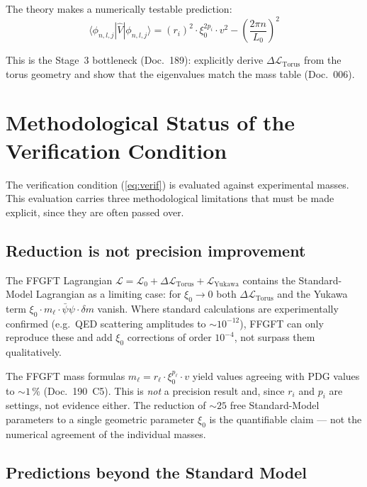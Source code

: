 The theory makes a numerically testable prediction:
\begin{equation}
  \boxed{
    \langle\phi_{n,l,j}|\hat{V}|\phi_{n,l,j}\rangle
    = (r_i)^2 \cdot \xi_0^{2p_i} \cdot v^2
      - \left(\frac{2\pi n}{L_0}\right)^2
  }
  \label{eq:verif}
\end{equation}

This is the Stage~3 bottleneck (Doc.~189): explicitly derive
$\Delta\mathcal{L}_{\text{Torus}}$ from the torus geometry and show
that the eigenvalues match the mass table (Doc.~006).

\section{Methodological Status of the Verification Condition}

The verification condition (\ref{eq:verif}) is evaluated against
experimental masses. This evaluation carries three methodological
limitations that must be made explicit, since they are often passed
over.

\subsection*{Reduction is not precision improvement}

The FFGFT Lagrangian
$\mathcal{L} = \mathcal{L}_0 + \Delta\mathcal{L}_{\text{Torus}} + \mathcal{L}_{\text{Yukawa}}$
contains the Standard-Model Lagrangian as a limiting case: for
$\xi_0 \to 0$ both $\Delta\mathcal{L}_{\text{Torus}}$ and the Yukawa
term $\xi_0\cdot m_\ell\cdot\bar\psi\psi\cdot\delta m$ vanish. Where
standard calculations are experimentally confirmed (e.g.\ QED
scattering amplitudes to $\sim 10^{-12}$), FFGFT can only reproduce
these and add $\xi_0$ corrections of order $10^{-4}$, not surpass them
qualitatively.

The FFGFT mass formulas $m_\ell = r_\ell\cdot\xi_0^{p_\ell}\cdot v$
yield values agreeing with PDG values to $\sim 1\,\%$ (Doc.~190~C5).
This is \emph{not} a precision result and, since $r_i$ and $p_i$ are
settings, not evidence either. The
reduction of $\sim 25$ free Standard-Model parameters to a single
geometric parameter $\xi_0$ is the quantifiable claim --- not the
numerical agreement of the individual masses.

\subsection*{Predictions beyond the Standard Model}

